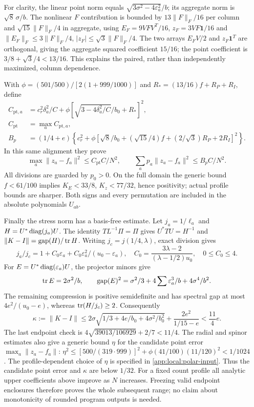 For clarity, the linear point norm equals
$\sqrt{3\sigma^2-4\varepsilon_a^2}/b$; its aggregate norm is
$\sqrt8\,\sigma/b$. The nonlinear $F$ contribution is bounded by
$13\|F\|_F/16$ per column and $\sqrt{15}\|F\|_F/4$ in aggregate,
using $E_F=9VFV^T/16$, $z_F=3VF\mathbf1/16$ and
$\|E_F\|_F\le3\|F\|_F/4$, $|z_F|\le\sqrt3\|F\|_F/4$.
The two arrays $E_FV/2$ and $z_F\mathbf1^T$ are orthogonal, giving
the aggregate squared coefficient $15/16$; the point coefficient is
$3/8+\sqrt3/4<13/16$. This explains the paired, rather than independently
maximized, column dependence.

With $\phi=(501/500)/[2(1+999/1000)]$ and
$R_*=(13/16)f+R_P+R_I$, define
\begin{align*}
 C_{\mathrm{pt},a}&=c_r^2\delta_a^2/C+
      \phi[\sqrt{3-4\delta_a^2/C}/b_0+R_*]^2,\\
 C_{\mathrm{pt}}&=\max_a C_{\mathrm{pt},a},\\
 B_p&=(1/4+e)\left\{c_r^2+
 \phi[\sqrt8/b_0+(\sqrt{15}/4)f+(2/\sqrt3)R_P+2R_I]^2\right\}.
\end{align*}
In this same alignment they prove
\begin{equation}\label{app:candidate:PB}
 \max_a\|z_a-f_a\|^2\le C_{\mathrm{pt}}C/N^2,
 \qquad \sum_a p_a\|z_a-f_a\|^2\le B_p C/N^2.
\end{equation}
All divisions are guarded by $p_0>0$. On the full domain the generic
bound $f<61/100$ implies $K_E<33/8$, $K_z<77/32$, hence positivity;
actual profile bounds are sharper. Both signs and every permutation
are included in the absolute polynomials $U_{ab}$.

Finally the stress norm has a basis-free estimate. Let $j_a=1/\ell_a$
and $H=U^*\operatorname{diag}(j_a)U$. The identity $TL^{-1}\Pi=\Pi$ gives
$U^*TU=H^{-1}$ and $\|K-I\|=\operatorname{gap}(H)/\operatorname{tr} H$.
Writing $j_c=j(1/4,\lambda)$, exact division gives
\[
 j_a/j_c=1+C_0\varepsilon_a+
             C_0\varepsilon_a^2/(u_0-\varepsilon_a),\quad
 C_0=\frac{3\lambda-2}{(\lambda-1/2)u_0},\quad0\le C_0\le4.
\]
For $E=U^*\operatorname{diag}(\varepsilon_a)U$, the projector minors give
\[
 \operatorname{tr} E=2\sigma^2/b,\qquad
 \operatorname{gap}(E)^2=\sigma^2/3+
             4\sum\varepsilon_a^3/b+4\sigma^4/b^2.
\]
The remaining compression is positive semidefinite and has spectral
gap at most $4e^2/(u_0-e)$, whereas $\operatorname{tr}(H/j_c)\ge2$. Consequently
\begin{equation}\label{app:candidate:kappa}
 \kappa:=\|K-I\|\le
 2\sigma\sqrt{1/3+4e/b_0+4\sigma^2/b_0^2}
                         +\frac{2e^2}{1/15-e}<\frac{11}4e.
\end{equation}
The last endpoint check is
$4\sqrt{39013/106929}+2/7<11/4$. The radial and spinor estimates also give a generic bound $\eta$
for the candidate point error $\max_a\|z_a-f_a\|$:
$\eta^2\le[500/(319\cdot999)]^2+
\phi(41/100)(11/120)^2<1/1024$.
The profile-dependent choice of $\eta$ is specified in
\eqref{app:local:polar-input}.
Thus the candidate point error and $\kappa$ are below $1/32$.
For a fixed count profile all
analytic upper coefficients above improve as $N$ increases. Freezing
valid endpoint enclosures therefore proves the whole subsequent range;
no claim about monotonicity of rounded program outputs is needed.
